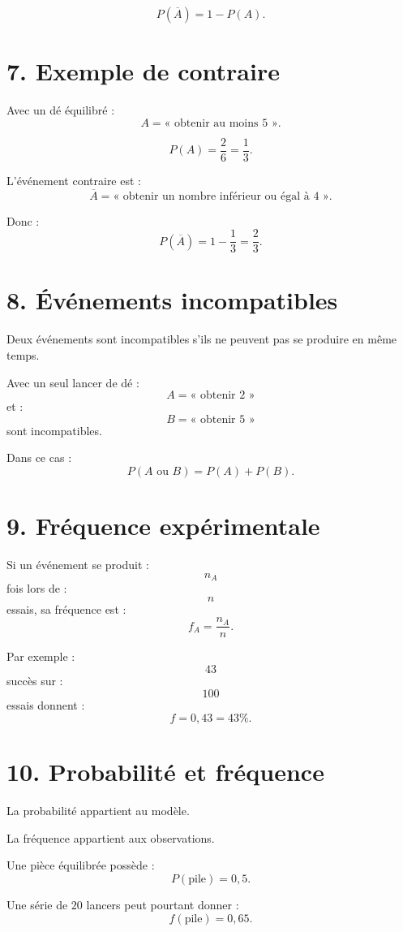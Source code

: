 \begin{propriete}
\[
\boxed{P(\overline A)=1-P(A)}.
\]
\end{propriete}

\section{7. Exemple de contraire}

Avec un dé équilibré :
\[
A=\text{« obtenir au moins }5\text{ »}.
\]

\[
P(A)=\dfrac26=\dfrac13.
\]

L'événement contraire est :
\[
\overline A=\text{« obtenir un nombre inférieur ou égal à }4\text{ »}.
\]

Donc :
\[
P(\overline A)=1-\dfrac13=\dfrac23.
\]

\section{8. Événements incompatibles}

Deux événements sont incompatibles s'ils ne peuvent pas se produire en même temps.

Avec un seul lancer de dé :
\[
A=\text{« obtenir }2\text{ »}
\]
et :
\[
B=\text{« obtenir }5\text{ »}
\]
sont incompatibles.

Dans ce cas :
\[
P(A\text{ ou }B)=P(A)+P(B).
\]

\section{9. Fréquence expérimentale}

Si un événement se produit :
\[
n_A
\]
fois lors de :
\[
n
\]
essais, sa fréquence est :
\[
\boxed{f_A=\dfrac{n_A}{n}}.
\]

Par exemple :
\[
43
\]
succès sur :
\[
100
\]
essais donnent :
\[
f=0{,}43=43\%.
\]

\section{10. Probabilité et fréquence}

La probabilité appartient au modèle.

La fréquence appartient aux observations.

Une pièce équilibrée possède :
\[
P(\text{pile})=0{,}5.
\]

Une série de $20$ lancers peut pourtant donner :
\[
f(\text{pile})=0{,}65.
\]

